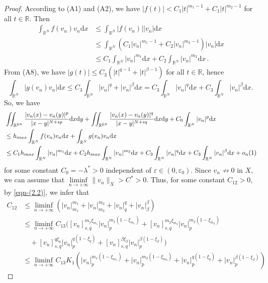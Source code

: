 \documentclass[10pt,a4paper]{amsart}
\numberwithin{equation}{section}
\begin{document}
\begin{proof}
According to (A1) and (A2), we have 
$|f(t)|<C_1|t|^{m_1-1}+C_1|t|^{m_2-1}$ for all $t\in\mathbb{R}$. Then
\begin{align*}
\int_{\mathbb{R}^N}f(v_n)v_n\mathrm{d}x
&\le \int_{\mathbb{R}^N}|f(v_n)||v_n|\mathrm{d}x\\
&\le\int_{\mathbb{R}^N}(C_1|v_n|^{m_1-1}+C_2|v_n|^{m_2-1})|v_n|\mathrm{d}x\\
&\le C_1\int_{\mathbb{R}^N}|v_n|^{m_1}\mathrm{d}x
+C_2\int_{\mathbb{R}^N}|v_n|^{m_2}\mathrm{d}x\,.
\end{align*}
From (A8), we have $|g(t)|\le C_3(|t|^{q-1}+|t|^{\beta-1})$ for all $t\in\mathbb{R} $, 
hence
$$
\int_{\mathbb{R}^N}|g(v_n)v_n|\mathrm{d}x
 \le C_3\int_{\mathbb{R}^N}|v_n|^{q}+|v_n|^{\beta}\mathrm{d}x
 =C_3\int_{\mathbb{R}^N}|v_n|^{q}\mathrm{d}x
 +C_3\int_{\mathbb{R}^N}|v_n|^{\beta}\mathrm{d}x.
$$
So, we have
\begin{align*}
&\iint_{\mathbb{R}^{2N}}\frac{|v_n(x)-v_n(y)|^{p}}{|x-y|^{N+sp}}
 \mathrm{d}x\mathrm{d}y+\iint_{\mathbb{R}^{2N}}\frac{|v_n(x)
 -v_n(y)|^{q}}{|x-y|^{N+sq}}\mathrm{d}x\mathrm{d}y
 +C_0\int_{\mathbb{R}^N}| v_n|^{p}\mathrm{d}x\\
&\le h_{\rm max}\int_{\mathbb{R}^N}f(v_n)v_n\mathrm{d}x
 +\int_{\mathbb{R}^N}g(v_n)v_n\mathrm{d}x\\
&\le C_1h_{\rm max}\int_{\mathbb{R}^N}|v_n|^{m_1}\mathrm{d}x
 +C_2h_{\rm max}\int_{\mathbb{R}^N}|v_n|^{m_2}\mathrm{d}x
 +C_3\int_{\mathbb{R}^N}|v_n|^{q}\mathrm{d}x
 +C_3\int_{\mathbb{R}^N}|v_n|^{\beta}\mathrm{d}x+o_n(1)
\end{align*}
for some constant $C_0=-\lambda^{*}>0$ independent of 
$\varepsilon\in(0,\varepsilon_0)$. Since $v_n\not\to0$  in $X$, we can assume that
$\underset{n\to+\infty}\liminf \|v_n\|_X > C^{*} > 0$.
Thus, for some constant $C_{12}>0$, by \eqref{eqn-(2.2)}, we infer that
\begin{equation}\label{eqn-(3.12)}
\begin{aligned}
C_{12}
&\leq \underset{n\to+\infty}\liminf(|v_n|_{m_1}^{m_1}+|v_n|_{m_2}^{m_2}+|v_n|_{q}^{q}
 +|v_n|_{\beta}^{\beta})\\
&\le \underset{n\to+\infty}\liminf C_{13}([v_n]_{{s,q}}^{m_1\xi_{m_1}}
 |v_n|_{p}^{m_1(1-\xi_{m_1})}+[v_n]_{{s,q}}^{m_2\xi_{m_2}}|v_n|_{p}^{m_2(1-\xi_{m_2})}\\
&\quad +[v_n]_{{s,q}}^{q\xi_{q}}|v_n|_{p}^{q(1-\xi_{q})}
 +[v_n]_{{s,q}}^{\beta\xi_{\beta}}|v_n|_{p}^{\beta(1-\xi_{\beta})})\\
&\leq  \liminf_{n\to+\infty}  C_{13}K_1(|v_n|_{p}^{m_1(1-\xi_{m_1})}
 +|v_n|_{p}^{m_2(1-\xi_{m_2})}+|v_n|_{p}^{q(1-\xi_{q})}+|v_n|_{p}^{\beta(1-\xi_{\beta})})

\end{aligned}
\end{equation}
\end{proof}
\end{document}
